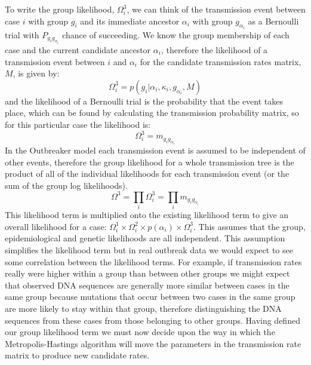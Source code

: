 \documentclass[11pt,a4paper]{report}
\begin{document}
To write the group likelihood, $\Omega^{3}_i$, we can think of the transmission event between case $i$ with group $g_i$ and its immediate ancestor $\alpha_i$ with group $g_{\alpha_{i}}$ as a Bernoulli trial with $P_{g_i g_{\alpha_{i}}}$ chance of succeeding. We know the group membership of each case and the current candidate ancestor $\alpha_i$, therefore the likelihood of a transmission event between $i$ and $\alpha_i$ for the candidate transmission rates matrix, $M$, is given by:
\[ \Omega_i^3 = p(g_i | \alpha_i, \kappa_i, g_{\alpha_i}, M) \]
and the likelihood of a Bernoulli trial is the probability that the event takes place, which can be found by calculating the transmission probability matrix, so for this particular case the likelihood is:
\[ \Omega_i^3 = m_{g_i g_{\alpha_i}} \]
In the Outbreaker model each transmission event is assumed to be independent of other events, therefore the group likelihood for a whole transmission tree is the product of all of the individual likelihoods for each transmission event (or the sum of the group log likelihoods).
\[ \Omega^3 = \prod_i{\Omega_i^3} = \prod_i{m_{g_i g_{\alpha_i}}} \]
This likelihood term is multiplied onto the existing likelihood term to give an overall likelihood for a case: $\Omega_i^1 \times \Omega_i^2 \times p(\alpha_i) \times \Omega_i^3$. This assumes that the group, epidemiological and genetic likelihoods are all independent. This assumption simplifies the likelihood term but in real outbreak data we would expect to see some correlation between the likelihood terms. For example, if transmission rates really were higher within a group than between other groups we might expect that observed DNA sequences are generally more similar between cases in the same group because mutations that occur between two cases in the same group are more likely to stay within that group, therefore distinguishing the DNA sequences from these cases from those belonging to other groups. Having defined our group likelihood term we must now decide upon the way in which the Metropolis-Hastings algorithm will move the parameters in the transmission rate matrix to produce new candidate rates.
\end{document}
